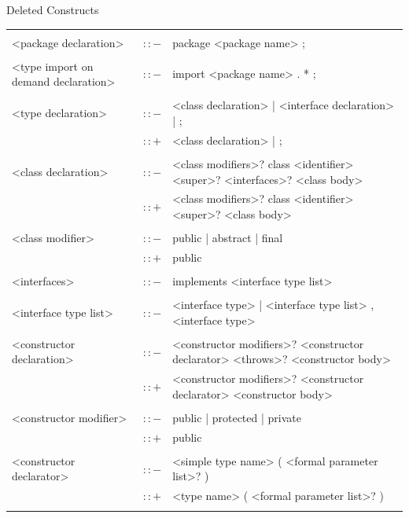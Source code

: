 \documentclass[landscape, 11pt]{article}
\begin{document}
\begin{qsection}{Deleted Constructs}
\begin{enumerate}[label=\bt{\theenumi.}]
			\begin{longtable}{R{7cm} c L{15cm}}
													&					&	 \\
				<package declaration>						&	$\colon\colon-$	&	package <package name> ; \\\\
				<type import on demand declaration>			&	$\colon\colon-$	&	import <package name> . * ; \\\\
				<type declaration>							&	$\colon\colon-$	&	<class declaration> | <interface declaration> | ; \\
															&	$\colon\colon+$	&	<class declaration> | ; \\\\
				<class declaration>							&	$\colon\colon-$	&	<class modifiers>? class <identifier> <super>? <interfaces>? <class body> \\
															&	$\colon\colon+$	&	<class modifiers>? class <identifier> <super>? <class body> \\\\
				<class modifier>							&	$\colon\colon-$	&	public | abstract | final \\
															&	$\colon\colon+$	&	public \\\\
				<interfaces>								&	$\colon\colon-$	&	implements <interface type list> \\\\
				<interface type list>						&	$\colon\colon-$	&	<interface type> | <interface type list> , <interface type> \\\\
				<constructor declaration>					&	$\colon\colon-$	&	<constructor modifiers>? <constructor declarator> <throws>? <constructor body> \\
															&	$\colon\colon+$	&	<constructor modifiers>? <constructor declarator> <constructor body> \\\\
				<constructor modifier>						&	$\colon\colon-$	&	public | protected | private \\
															&	$\colon\colon+$	&	public \\\\
				<constructor declarator>					&	$\colon\colon-$	&	<simple type name> ( <formal parameter list>? ) \\
															&	$\colon\colon+$	&	<type name> ( <formal parameter list>? ) \\\\

\end{longtable}
\end{enumerate}
\end{qsection}
\end{document}
